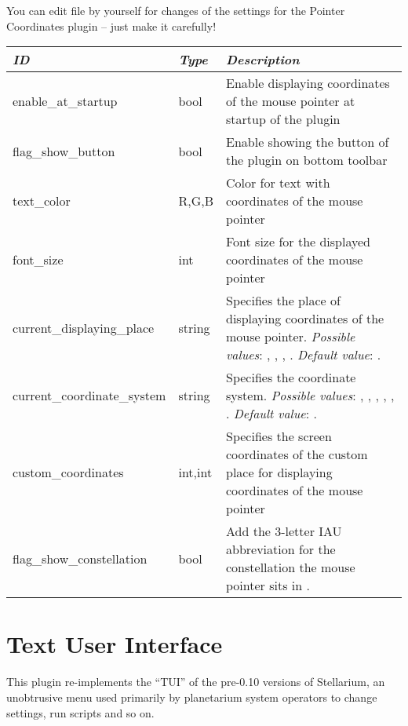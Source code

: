You can edit  file by yourself for changes of the
settings for the Pointer Coordinates plugin -- just make it carefully!

\begin{longtabu} to \textwidth {l|l|X}\toprule
\emph{ID}            & \emph{Type} & \emph{Description}\\\midrule
enable\_at\_startup  & bool & Enable displaying coordinates of the mouse pointer at startup of the plugin\\\midrule
flag\_show\_button   & bool & Enable showing the button of the plugin on bottom toolbar\\\midrule
text\_color          & R,G,B & Color for text with coordinates of the mouse pointer \\\midrule
font\_size           & int & Font size for the displayed coordinates of the mouse pointer \\\midrule
current\_displaying\_place  & string & Specifies the place of displaying coordinates of the mouse pointer. \textit{Possible values}: , , , . \textit{Default value}: . \\\midrule
current\_coordinate\_system & string & Specifies the coordinate system. \textit{Possible values}: , , , , , . \textit{Default value}: . \\\midrule
custom\_coordinates  & int,int & Specifies the screen coordinates of the custom place for displaying coordinates of the mouse pointer \\\midrule
flag\_show\_constellation &bool& Add the 3-letter IAU abbreviation for the constellation the mouse pointer sits in \cite{1987PASP...99..695R}.\\\bottomrule
\end{longtabu}




\newpage

\section{Text User Interface}
\label{sec:plugins:TextUserInterface}


This plugin re-implements the ``TUI'' of the pre-0.10 versions of
Stellarium, an unobtrusive menu used primarily by planetarium system
operators to change settings, run scripts and so on.

